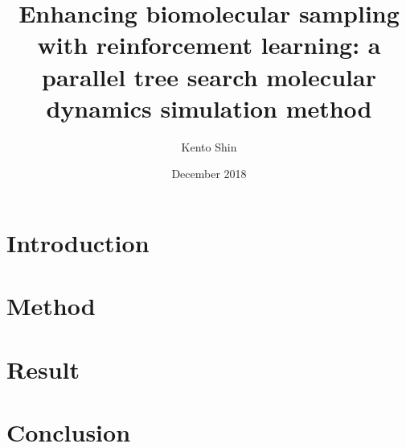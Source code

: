 \documentclass[journal=jacsat, manuscript=article]{achemso}
\title{Enhancing biomolecular sampling with reinforcement learning: a parallel tree search molecular dynamics simulation method}
\author{Kento Shin}
\date{December 2018}
\begin{document}
\maketitle

\begin{abstract}

\end{abstract}

\section{Introduction}


\section{Method}



\section{Result}


\section{Conclusion}




\end{document}
